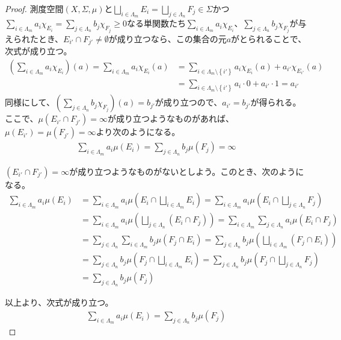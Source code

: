 \documentclass[dvipdfmx]{jsarticle}
\begin{document}
\begin{proof}
測度空間$(X,\varSigma,\mu)$と$\bigsqcup_{i \in \varLambda_{m}} E_{i} = \bigsqcup_{j \in \varLambda_{n}} F_{j} \in \varSigma$かつ$\sum_{i \in \varLambda_{m}} {a_{i}\chi_{E_{i}}} = \sum_{j \in \varLambda_{n}} {b_{j}\chi_{F_{j}}} \geq 0$なる単関数たち$\sum_{i \in \varLambda_{m}} {a_{i}\chi_{E_{i}}}$、$\sum_{j \in \varLambda_{n}} {b_{j}\chi_{F_{j}}}$が与えられたとき、$E_{i'} \cap F_{j'} \neq \emptyset$が成り立つなら、この集合の元$a$がとられることで、次式が成り立つ。
\begin{align*}
\left( \sum_{i \in \varLambda_{m}} {a_{i}\chi_{E_{i}}} \right)(a) = \sum_{i \in \varLambda_{m}} {a_{i}\chi_{E_{i}}(a)} &= \sum_{i \in \varLambda_{m} \setminus \left\{ i' \right\}} {a_{i}\chi_{E_{i}}(a)} + a_{i'}\chi_{E_{i'}}(a)\\
&= \sum_{i \in \varLambda_{m} \setminus \left\{ i' \right\}} {a_{i} \cdot 0} + a_{i'} \cdot 1 = a_{i'}
\end{align*}
同様にして、$\left( \sum_{j \in \varLambda_{n}} {b_{j}\chi_{F_{j}}} \right)(a) = b_{j'}$が成り立つので、$a_{i'} = b_{j'}$が得られる。ここで、$\mu\left( E_{i'} \cap F_{j'} \right) = \infty$が成り立つようなものがあれば、$\mu\left( E_{i'} \right) = \mu\left( F_{j'} \right) = \infty$より次のようになる。
\begin{align*}
\sum_{i \in \varLambda_{m}} {a_{i}\mu\left( E_{i} \right)} = \sum_{j \in \varLambda_{n}} {b_{j}\mu\left( F_{j} \right)} = \infty
\end{align*}\par
$\left( E_{i'} \cap F_{j'} \right) = \infty$が成り立つようなものがないとしよう。このとき、次のようになる。
\begin{align*}
\sum_{i \in \varLambda_{m}} {a_{i}\mu\left( E_{i} \right)} &= \sum_{i \in \varLambda_{m}} {a_{i}\mu\left( E_{i} \cap \bigsqcup_{i \in \varLambda_{m}} E_{i} \right)} = \sum_{i \in \varLambda_{m}} {a_{i}\mu\left( E_{i} \cap \bigsqcup_{j \in \varLambda_{n}} F_{j} \right)}\\
&= \sum_{i \in \varLambda_{m}} {a_{i}\mu\left( \bigsqcup_{j \in \varLambda_{n}} \left( E_{i} \cap F_{j} \right) \right)} = \sum_{i \in \varLambda_{m}} {\sum_{j \in \varLambda_{n}} {a_{i}\mu\left( E_{i} \cap F_{j} \right)}}\\
&= \sum_{j \in \varLambda_{n}} {\sum_{i \in \varLambda_{m}} {b_{j}\mu\left( F_{j} \cap E_{i} \right)}} = \sum_{j \in \varLambda_{n}} {b_{j}\mu\left( \bigsqcup_{i \in \varLambda_{m}} \left( F_{j} \cap E_{i} \right) \right)}\\
&= \sum_{j \in \varLambda_{n}} {b_{j}\mu\left( F_{j} \cap \bigsqcup_{i \in \varLambda_{m}} E_{i} \right)} = \sum_{j \in \varLambda_{n}} {b_{j}\mu\left( F_{j} \cap \bigsqcup_{j \in \varLambda_{n}} F_{j} \right)}\\
&= \sum_{j \in \varLambda_{n}} {b_{j}\mu\left( F_{j} \right)}
\end{align*}\par
以上より、次式が成り立つ。
\begin{align*}
\sum_{i \in \varLambda_{m}} {a_{i}\mu\left( E_{i} \right)} = \sum_{j \in \varLambda_{n}} {b_{j}\mu\left( F_{j} \right)}
\end{align*}
\end{proof}
\end{document}
